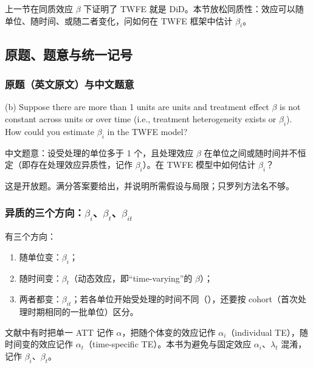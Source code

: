 上一节在同质效应 $\beta$ 下证明了 TWFE 就是 DiD。本节放松同质性：效应可以随单位、随时间、或随二者变化，问如何在 TWFE 框架中估计 $\beta_i$。

\subsection{原题、题意与统一记号}

\subsubsection{原题（英文原文）与中文题意}

\begin{tcolorbox}[bxbase,colback=gray!4,colframe=gray!55!black,boxed title style={colback=gray!55!black},fontupper=\small,title={Question (2), part (b)}]
(b) Suppose there are more than 1 units are units and treatment effect $\beta$ is not constant across units or over time (i.e., treatment heterogeneity exists or $\beta_i$). How could you estimate $\beta_i$ in the TWFE model?
\end{tcolorbox}

中文题意：设受处理的单位多于 1 个，且处理效应 $\beta$ 在单位之间或随时间并不恒定（即存在处理效应异质性，记作 $\beta_i$）。在 TWFE 模型中如何估计 $\beta_i$？

这是开放题。满分答案要给出，并说明所需假设与局限；只罗列方法名不够。

\subsubsection{异质的三个方向：\texorpdfstring{$\beta_i$、$\beta_t$、$\beta_{it}$}{beta\_i, beta\_t, beta\_it}}

有三个方向：
\begin{enumerate}
  \item 随单位变：$\beta_i$；
  \item 随时间变：$\beta_t$（动态效应，即“time-varying”的 $\beta$）；
  \item 两者都变：$\beta_{it}$；若各单位开始受处理的时间不同（），还要按 cohort（首次处理时期相同的一批单位）区分。
\end{enumerate}
文献中有时把单一 ATT 记作 $\alpha$，把随个体变的效应记作 $\alpha_i$（individual TE），随时间变的效应记作 $\alpha_t$（time-specific TE）。本书为避免与固定效应 $\alpha_i$、$\lambda_t$ 混淆，记作 $\beta_i$、$\beta_t$。

